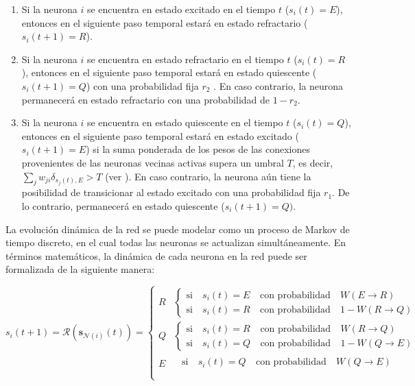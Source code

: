 \begin{definitionT}
\begin{enumerate}[label=(\roman*)]
\item Si la neurona $i$ se encuentra en estado excitado en el tiempo $t$ ($s_i(t) = E$), entonces en el siguiente paso temporal estará en estado refractario ($s_i(t + 1) = R$).
\item Si la neurona $i$ se encuentra en estado refractario en el tiempo $t$  ($s_i(t) = R$), entonces en el siguiente paso temporal estará en estado quiescente ($s_i(t + 1) = Q$) con una probabilidad fija $r_2$ .  En caso contrario, la neurona permanecerá en estado refractario con una probabilidad de $1 - r_2$.
\item Si la neurona $i$ se encuentra en estado quiescente en el tiempo   $t$  ($s_i(t) = Q$), entonces en el siguiente paso temporal estará en estado excitado ($s_i(t + 1) = E$) si la suma ponderada de los pesos de las conexiones provenientes de las neuronas vecinas activas supera un umbral $T$, es decir, $\sum_j w_{ji}\delta_{s_j(t),E}>T$ (ver ). En caso contrario, la neurona aún tiene la posibilidad de transicionar al estado excitado con una probabilidad fija $r_1$. De lo contrario, permanecerá en estado quiescente ($s_i(t + 1) = Q)$.

\end{enumerate}	
	
La evolución dinámica de la red se puede modelar como un proceso de Markov de tiempo discreto, en el cual todas las neuronas se actualizan simultáneamente. En términos matemáticos, la dinámica de cada neurona en la red puede ser formalizada de la siguiente manera:

\begin{equation}
	s_i(t+1)=\mathcal{R}(\mathbf{s}_{\mathcal{N}(i)}(t))=\begin{cases}
 	R& \left\{\begin{aligned}
 		  \text{si}  & \  s_i(t)=E &\  \text{con probabilidad} & \ W(E\to R)  \\
 		\text{si}  &\   s_i(t)=R   & \ \text{con probabilidad}  &\  1-W(R\to Q)
 	\end{aligned}\right.\\
	 	Q & \left\{\begin{aligned}
		\text{si}  & \  s_i(t)=R &\  \text{con probabilidad} & \ W(R\to Q)  \\
		\text{si}  &\   s_i(t)=Q   & \ \text{con probabilidad}  &\  1-W(Q\to E)
	\end{aligned}\right.\\	
		E & \left.\begin{aligned}
		\ \ \text{si}  & \  s_i(t)=Q &\  \text{con probabilidad} & \ W(Q\to E)  \\
	\end{aligned}\right.\\
	\end{cases}
\end{equation}


\end{definitionT}

